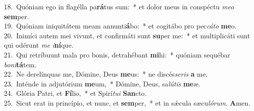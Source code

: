 {18.~}Quóniam ego in flagélla pa\textbf{rá}tus sum:~* et dolor meus in conspéctu \textit{me}\textit{o} \textbf{sem}per.\\
{19.~}Quóniam iniquitátem meam annunti\textbf{á}bo:~* et cogitábo pro pec\textit{cá}\textit{to} \textbf{me}o.\\
{20.~}Inimíci autem mei vivunt, et confirmáti sunt \textbf{su}per me:~* et multiplicáti sunt qui odérunt \textit{me} \textit{i}\textbf{ní}que.\\
{21.~}Qui retríbuunt mala pro bonis, detrahébant \textbf{mi}hi:~* quóniam sequébar \textit{bo}\textit{ni}\textbf{tá}tem.\\
{22.~}Ne derelínquas me, Dómine, Deus \textbf{me}us:~* ne discés\textit{se}\textit{ris} \textbf{a} me.\\
{23.~}Inténde in adjutórium \textbf{me}um,~* Dómine, Deus, sa\textit{lú}\textit{tis} \textbf{me}æ.\\
{24.~}Glória Patri, et \textbf{Fí}lio,~* et Spirí\textit{tu}\textit{i} \textbf{San}cto.\\
{25.~}Sicut erat in princípio, et nunc, et \textbf{sem}per,~* et in sǽcula sæcu\textit{ló}\textit{rum}. \textbf{A}men.\\
